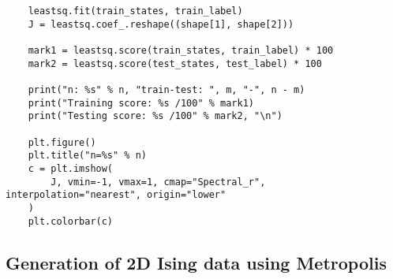 \begin{verbatim}
    leastsq.fit(train_states, train_label)
    J = leastsq.coef_.reshape((shape[1], shape[2]))

    mark1 = leastsq.score(train_states, train_label) * 100
    mark2 = leastsq.score(test_states, test_label) * 100

    print("n: %s" % n, "train-test: ", m, "-", n - m)
    print("Training score: %s /100" % mark1)
    print("Testing score: %s /100" % mark2, "\n")

    plt.figure()
    plt.title("n=%s" % n)
    c = plt.imshow(
        J, vmin=-1, vmax=1, cmap="Spectral_r", interpolation="nearest", origin="lower"
    )
    plt.colorbar(c)
\end{verbatim}

\subsection{Generation of 2D Ising data using Metropolis}

